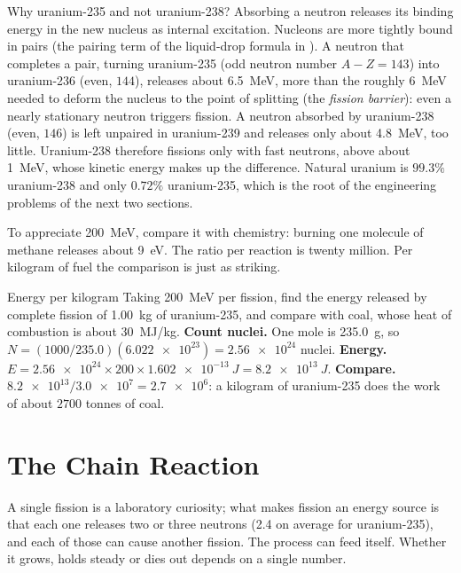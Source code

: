 \begin{remarkbox}{Why uranium-235 and not uranium-238?}
Absorbing a neutron releases its binding energy in the new nucleus as internal excitation. Nucleons are
more tightly bound in pairs (the pairing term of the liquid-drop formula in ). A neutron
that completes a pair, turning uranium-235 (odd neutron number $A-Z=143$) into uranium-236 (even, $144$),
releases about \SI{6.5}{\MeV}, more than the roughly \SI{6}{\MeV} needed to deform the nucleus to the
point of splitting (the \emph{fission barrier}): even a nearly stationary neutron triggers fission. A
neutron absorbed by uranium-238 (even, $146$) is left unpaired in uranium-239 and releases only about
\SI{4.8}{\MeV}, too little. Uranium-238 therefore fissions only with fast neutrons, above about
\SI{1}{\MeV}, whose kinetic energy makes up the difference. Natural uranium is $99.3\%$ uranium-238 and
only $0.72\%$ uranium-235, which is the root of the engineering problems of the next two sections.
\end{remarkbox}

To appreciate \SI{200}{\MeV}, compare it with chemistry: burning one molecule of methane releases about
\SI{9}{eV}. The ratio per reaction is twenty million. Per kilogram of fuel the comparison is just as
striking.

\begin{exbox}{Energy per kilogram}\label{ex:react-perkg}
Taking \SI{200}{\MeV} per fission, find the energy released by complete fission of \SI{1.00}{kg} of
uranium-235, and compare with coal, whose heat of combustion is about \SI{30}{MJ/kg}.
 \textbf{Count nuclei.} One mole is \SI{235.0}{g}, so
$N=(1000/235.0)(\num{6.022e23})=\num{2.56e24}$ nuclei.
 \textbf{Energy.} $E=\num{2.56e24}\times200\times\SI{1.602e-13}{J}=\SI{8.2e13}{J}$.
 \textbf{Compare.} $\num{8.2e13}/\num{3.0e7}=\num{2.7e6}$: a kilogram of uranium-235 does the
work of about $2700$ tonnes of coal.
\end{exbox}

\section{The Chain Reaction}\label{sec:react-chain}

A single fission is a laboratory curiosity; what makes fission an energy source is that each one releases
two or three neutrons (2.4 on average for uranium-235), and each of those can cause another fission. The
process can feed itself. Whether it grows, holds steady or dies out depends on a single number.

